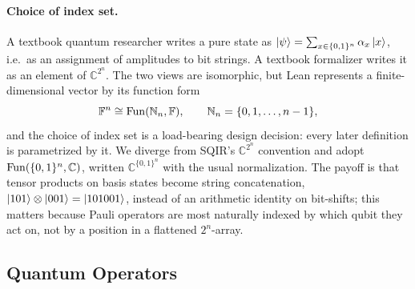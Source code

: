 \paragraph{Choice of index set.} A textbook quantum researcher writes a pure
state as
$\ket{\psi} = \sum_{x \in \{0,1\}^n} \alpha_x \ket{x}$,
i.e.\ as an assignment of amplitudes to bit strings. A textbook formalizer
writes it as an element of $\mathbb{C}^{2^n}$. The two views are isomorphic, but
Lean represents a finite-dimensional vector by its function form
\begin{equation}
    \label{eq:vec-equiv-fn}
    \mathbb{F}^n \cong \operatorname{Fun}(\mathbb{N}_n, \mathbb{F}), \qquad \mathbb{N}_n = \{0, 1, \ldots, n-1\},
\end{equation}
and the choice of index set is a load-bearing design decision: every later
definition is parametrized by it. We diverge from SQIR's $\mathbb{C}^{2^n}$
convention and adopt $\operatorname{Fun}(\{0,1\}^n, \mathbb{C})$, written
$\mathbb{C}^{\{0,1\}^n}$ with the usual normalization. The payoff is that
tensor products on basis states become string concatenation, $\ket{101} \otimes
\ket{001} = \ket{101001}$, instead of an arithmetic identity on bit-shifts; this
matters because Pauli operators are most naturally indexed by which qubit they
act on, not by a position in a flattened $2^n$-array.

\subsection{Quantum Operators}

